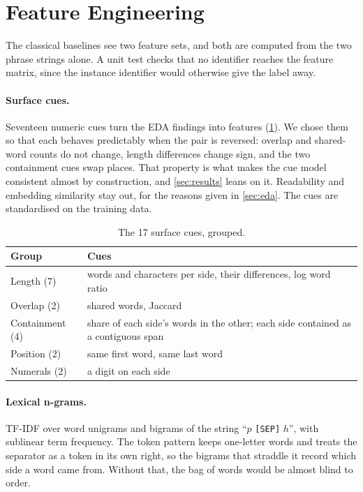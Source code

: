 \section{Feature Engineering}
\label{sec:features}

The classical baselines see two feature sets, and both are computed from the two phrase strings alone. A unit test checks that no identifier reaches the feature matrix, since the instance identifier would otherwise give the label away.

\paragraph{Surface cues.}
Seventeen numeric cues turn the EDA findings into features (\cref{tab:cues}). We chose them so that each behaves predictably when the pair is reversed: overlap and shared-word counts do not change, length differences change sign, and the two containment cues swap places. That property is what makes the cue model consistent almost by construction, and \cref{sec:results} leans on it. Readability and embedding similarity stay out, for the reasons given in \cref{sec:eda}. The cues are standardised on the training data.

\begin{table}[t]
\centering
\small
\begin{tabular}{@{}p{}p{}@{}}
\toprule
Group & Cues \\
\midrule
Length (7) & words and characters per side, their differences, log word ratio \\
Overlap (2) & shared words, Jaccard \\
Containment (4) & share of each side's words in the other; each side contained as a contiguous span \\
Position (2) & same first word, same last word \\
Numerals (2) & a digit on each side \\
\bottomrule
\end{tabular}
\caption{The 17 surface cues, grouped.}
\label{tab:cues}
\end{table}

\paragraph{Lexical n-grams.}
TF-IDF over word unigrams and bigrams of the string ``$p$ \texttt{[SEP]} $h$'', with sublinear term frequency. The token pattern keeps one-letter words and treats the separator as a token in its own right, so the bigrams that straddle it record which side a word came from. Without that, the bag of words would be almost blind to order.
